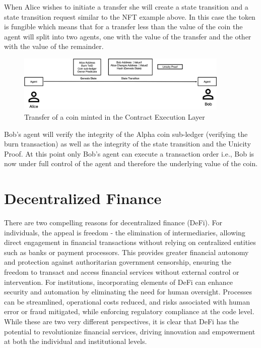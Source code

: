 \documentclass{article}
\begin{document}
When Alice wishes to initiate a transfer she will create a state transition and a state transition request similar to the NFT example above. In this case the token is fungible which means that for a transfer less than the value of the coin the agent will split into two agents, one with the value of the transfer and the other with the value of the remainder.

\begin{figure}[H]
    \centering
    \includegraphics[width=0.9\textwidth]{Alice-Transfer.png}
    \caption{Transfer of a coin minted in the Contract Execution Layer}
    \label{fig:Alice Transfer}
\end{figure}


\vspace{2mm}

Bob's agent will verify the integrity of the Alpha coin sub-ledger (verifying the burn transaction) as well as the integrity of the state transition and the Unicity Proof. At this point only Bob's agent can execute a transaction order i.e., Bob is now under full control of the agent and therefore the underlying value of the coin.

\vspace{2mm}


\section{Decentralized Finance}
There are two compelling reasons for decentralized finance (DeFi). For individuals, the appeal is freedom - the elimination of intermediaries, allowing direct engagement in financial transactions without relying on centralized entities such as banks or payment processors. This provides greater financial autonomy and protection against authoritarian government censorship, ensuring the freedom to transact and access financial services without external control or intervention. For institutions, incorporating elements of DeFi can enhance security and automation by eliminating the need for human oversight. Processes can be streamlined, operational costs reduced, and risks associated with human error or fraud mitigated, while enforcing regulatory compliance at the code level. While these are two very different perspectives, it is clear that DeFi has the potential to revolutionize financial services, driving innovation and empowerment at both the individual and institutional levels.
\end{document}
